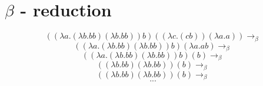 \documentclass[12pt]{article}
\begin{document}
\section*{\ensuremath{\beta} - reduction}
\[  (({\lambda} a.({\lambda} b.bb)({\lambda} b.bb))b)(({\lambda} c.(cb))({\lambda} a.a))  \rightarrow_{\beta}\]
\[  (({\lambda} a.({\lambda} b.bb)({\lambda} b.bb))b)({\lambda} a. a b) \rightarrow_{\beta}\]
\[  (({\lambda} a.({\lambda} b.bb)({\lambda} b.bb))b)(b) \rightarrow_{\beta}\]
\[  (({\lambda} b.bb)({\lambda} b.bb))(b) \rightarrow_{\beta}\]
\[  (({\lambda} b.bb)({\lambda} b.bb))(b) \rightarrow_{\beta}\]
\[ ... \]
\end{document}
